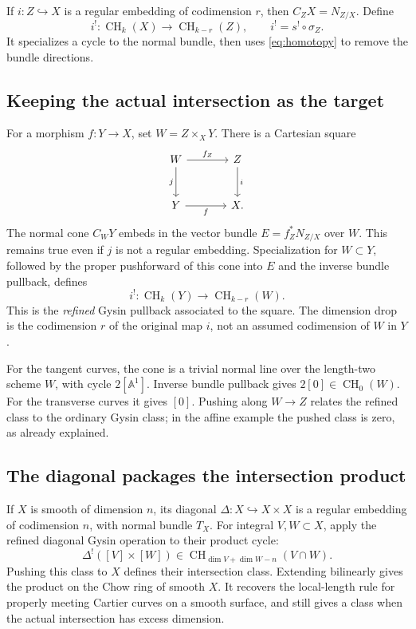 \documentclass[11pt,a4paper]{article}
\numberwithin{equation}{section}
\theoremstyle{definition}
\newcommand{\A}{\mathbb A}
\newcommand{\CH}{\operatorname{CH}}
\begin{document}
If $i:Z\hookrightarrow X$ is a regular embedding of codimension $r$,
then $C_ZX=N_{Z/X}$. Define
\begin{equation}\label{eq:ordinary-gysin}
i^!:\CH_k(X)\longrightarrow\CH_{k-r}(Z),\qquad
i^!=s^!\circ\sigma_Z.
\end{equation}
It specializes a cycle to the normal bundle, then uses
\eqref{eq:homotopy} to remove the bundle directions.

\subsection{Keeping the actual intersection as the target}
For a morphism $f:Y\to X$, set $W=Z\times_XY$. There is a Cartesian
square
\[
\begin{tikzcd}[column sep=large,row sep=large]
W\arrow[r,"f_Z"]\arrow[d,"j"']&Z\arrow[d,"i"]\\
Y\arrow[r,"f"']&X.
\end{tikzcd}
\]
The normal cone $C_WY$ embeds in the vector bundle
$E=f_Z^*N_{Z/X}$ over $W$. This remains true even if $j$ is not a
regular embedding. Specialization for $W\subset Y$, followed by
the proper pushforward of this cone into $E$ and the inverse bundle
pullback, defines
\begin{equation}\label{eq:refined-gysin}
i^!:\CH_k(Y)\longrightarrow\CH_{k-r}(W).
\end{equation}
This is the \emph{refined} Gysin pullback associated to the square.
The dimension drop is the codimension $r$ of the original map $i$,
not an assumed codimension of $W$ in $Y$.

For the tangent curves, the cone is a trivial normal line over the
length-two scheme $W$, with cycle $2[\A^1]$. Inverse bundle pullback
gives $2[0]\in\CH_0(W)$. For the transverse curves it gives $[0]$.
Pushing along $W\to Z$ relates the refined class to the ordinary
Gysin class; in the affine example the pushed class is zero, as
already explained.

\subsection{The diagonal packages the intersection product}
If $X$ is smooth of dimension $n$, its diagonal
$\Delta:X\hookrightarrow X\times X$ is a regular embedding of
codimension $n$, with normal bundle $T_X$. For integral $V,W\subset X$,
apply the refined diagonal Gysin operation to their product cycle:
\[
\Delta^!([V]\times[W])\in
\CH_{\dim V+\dim W-n}(V\cap W).
\]
Pushing this class to $X$ defines their intersection class. Extending
bilinearly gives the product on the Chow ring of smooth $X$.
It recovers the local-length rule for properly meeting Cartier
curves on a smooth surface, and still gives a class when the actual
intersection has excess dimension.
\end{document}
